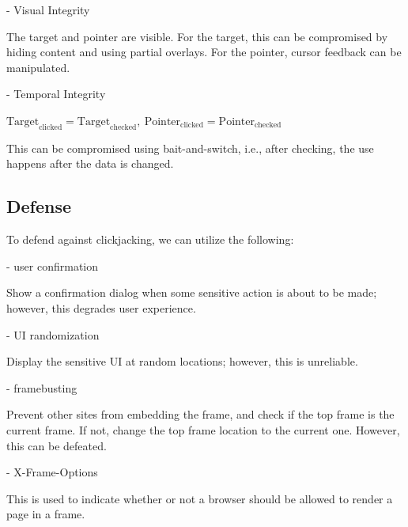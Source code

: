 - Visual Integrity  

The target and pointer are visible. For the target, this can be compromised by hiding content and using partial overlays. For the pointer, cursor feedback can be manipulated. 

- Temporal Integrity  

\(\text{Target}_{\text{clicked}} = \text{Target}_{\text{checked}},\ \text{Pointer}_{\text{clicked}} = \text{Pointer}_{\text{checked}}\)

This can be compromised using bait-and-switch, i.e., after checking, the use happens after the data is changed. 

\subsection{Defense}
To defend against clickjacking, we can utilize the following:

- user confirmation  

Show a confirmation dialog when some sensitive action is about to be made; however, this degrades user experience.  

- UI randomization  

Display the sensitive UI at random locations; however, this is unreliable.  

- framebusting  

Prevent other sites from embedding the frame, and check if the top frame is the current frame. If not, change the top frame location to the current one. However, this can be defeated.  

- X-Frame-Options  

This is used to indicate whether or not a browser should be allowed to render a page in a frame.  